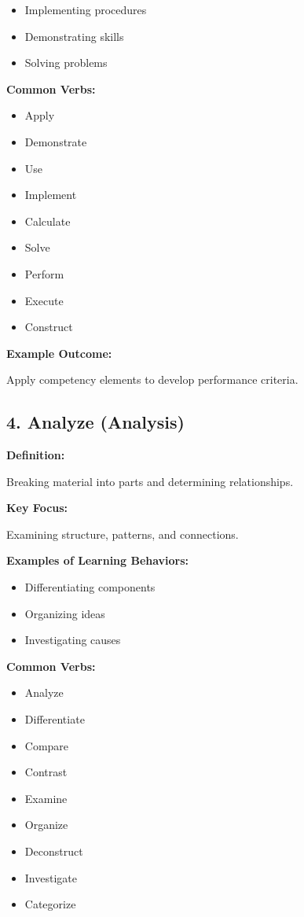\documentclass[12pt]{article}
\begin{document}
\begin{itemize}
    \item Implementing procedures
    \item Demonstrating skills
    \item Solving problems
\end{itemize}

\textbf{Common Verbs:}

\begin{itemize}
    \item Apply
    \item Demonstrate
    \item Use
    \item Implement
    \item Calculate
    \item Solve
    \item Perform
    \item Execute
    \item Construct
\end{itemize}

\textbf{Example Outcome:}

Apply competency elements to develop performance criteria.

\subsection{4. Analyze (Analysis)}

\textbf{Definition:}

Breaking material into parts and determining relationships.

\textbf{Key Focus:}

Examining structure, patterns, and connections.

\textbf{Examples of Learning Behaviors:}

\begin{itemize}
    \item Differentiating components
    \item Organizing ideas
    \item Investigating causes
\end{itemize}

\textbf{Common Verbs:}

\begin{itemize}
    \item Analyze
    \item Differentiate
    \item Compare
    \item Contrast
    \item Examine
    \item Organize
    \item Deconstruct
    \item Investigate
    \item Categorize
\end{itemize}
\end{document}
